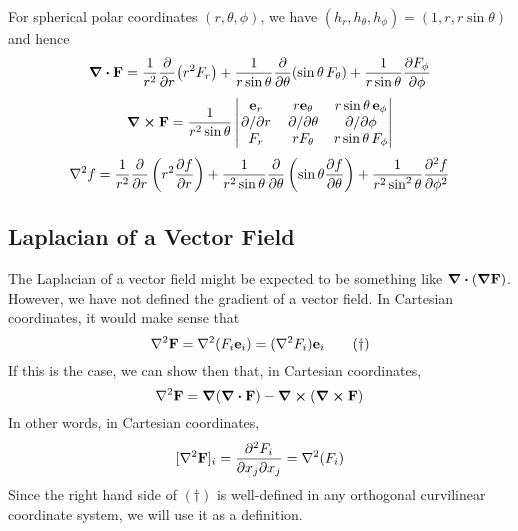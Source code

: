 For spherical polar coordinates \((r, \theta, \phi)\), we have \((h_r, h_\theta, h_\phi) = (1, r, r\sin\theta)\) and hence
\[
	\div{\vb F} = \frac{1}{r^2} \pdv{r}(r^2 F_r) + \frac{1}{r\sin\theta} \pdv{\theta}(\sin \theta\, F_\theta) + \frac{1}{r\sin\theta} \pdv{F_\phi}{\phi}
\]
\[
	\curl{\vb F} = \frac{1}{r^2\sin\theta} \begin{vmatrix}
		\vb e_r  & r \vb e_\theta & r\sin\theta\, \vb e_\phi \\
		\pdv*{r} & \pdv*{\theta}  & \pdv*{\phi}              \\
		F_r      & r F_\theta     & r\sin\theta\, F_\phi
	\end{vmatrix}
\]
\[
	\laplacian{f} = \frac{1}{r^2} \pdv{r} \left( r^2 \pdv{f}{r} \right) + \frac{1}{r^2 \sin\theta} \pdv{\theta} \left( \sin \theta \pdv{f}{\theta} \right) + \frac{1}{r^2\sin^2 \theta} \pdv[2]{f}{\phi}
\]

\subsection{Laplacian of a Vector Field}
The Laplacian of a vector field might be expected to be something like \(\div(\grad {\vb F})\).
However, we have not defined the gradient of a vector field.
In Cartesian coordinates, it would make sense that
\begin{equation}
	\laplacian{\vb F} = \laplacian(F_i \vb e_i) = (\laplacian{F_i})\vb e_i
	\tag{\(\dagger\)}
\end{equation}
If this is the case, we can show then that, in Cartesian coordinates,
\[
	\laplacian{\vb F} = \grad(\div{\vb F}) - \curl(\curl{\vb F})
\]
In other words, in Cartesian coordinates,
\[
	[\laplacian{\vb F}]_i = \pdv{F_i}{x_j}{x_j} = \laplacian(F_i)
\]
Since the right hand side of \((\dagger)\) is well-defined in any orthogonal curvilinear coordinate system, we will use it as a definition.
